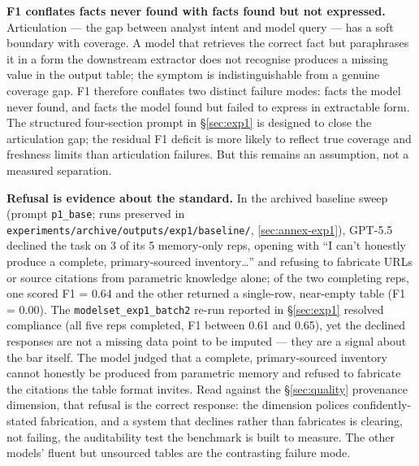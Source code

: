\documentclass[a4paper,11pt]{article}
\begin{document}
\textbf{F1 conflates facts never found with facts found but not
expressed.} Articulation --- the gap between analyst intent and model
query --- has a soft boundary with coverage. A model that retrieves the
correct fact but paraphrases it in a form the downstream extractor does
not recognise produces a missing value in the output table; the symptom
is indistinguishable from a genuine coverage gap. F1 therefore conflates
two distinct failure modes: facts the model never found, and facts the
model found but failed to express in extractable form. The structured
four-section prompt in §\ref{sec:exp1} is designed to close the
articulation gap; the residual F1 deficit is more likely to reflect true
coverage and freshness limits than articulation failures. But this
remains an assumption, not a measured separation.

\textbf{Refusal is evidence about the standard.} In the archived
baseline sweep (prompt \texttt{p1\_base}; runs preserved in
\texttt{experiments/archive/outputs/exp1/baseline/},
\ref{sec:annex-exp1}), GPT-5.5 declined the task on 3 of its 5
memory-only reps, opening with ``I can't honestly produce a complete,
primary-sourced inventory\ldots{}'' and refusing to fabricate URLs or
source citations from parametric knowledge alone; of the two completing
reps, one scored F1 = 0.64 and the other returned a single-row,
near-empty table (F1 = 0.00). The \texttt{modelset\_exp1\_batch2} re-run
reported in §\ref{sec:exp1} resolved compliance (all five reps
completed, F1 between 0.61 and 0.65), yet the declined responses are not
a missing data point to be imputed --- they are a signal about the bar
itself. The model judged that a complete, primary-sourced inventory
cannot honestly be produced from parametric memory and refused to
fabricate the citations the table format invites. Read against the
§\ref{sec:quality} provenance dimension, that refusal is the correct
response: the dimension polices confidently-stated fabrication, and a
system that declines rather than fabricates is clearing, not failing,
the auditability test the benchmark is built to measure. The other
models' fluent but unsourced tables are the contrasting failure mode.
\end{document}
